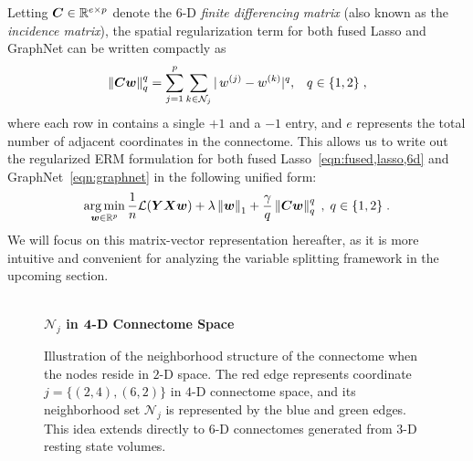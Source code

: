 Letting ${\bm{C}}\in\mathbb{R}^{e\times p}$ denote the $6$-D \emph{finite differencing matrix} (also known as the \emph{incidence matrix}), the spatial regularization term for both fused Lasso and GraphNet can be written compactly as
\begin{equation}
	\left\| {\bm{C}}{\bm{w}} \right\|_q^q=\sum_{j=1}^p\sum_{k\in\mathcal{N}_j} |\,w^{(j)}-w^{(k)}|^q,\;\;\; q\in\{1,2\} \;,
	\nonumber
\end{equation}
where each row in \C contains a single $+1$ and a $-1$ entry, and $e$ represents the total number of adjacent coordinates in the connectome.
This allows us to write out the regularized ERM formulation for both fused Lasso~\eqref{eqn:fused,lasso,6d} and GraphNet~\eqref{eqn:graphnet} in the following unified form: 
\begin{equation}
	\operatorname*{arg\,min}_{{\bm{w}}\in\mathbb{R}^p} \frac{1}{n}\mathcal{L}({\bm{YXw}}) + \lambda\left\| {\bm{w}} \right\|_1 + \frac{\gamma}{q}\left\| {\bm{C}}{\bm{w}} \right\|^q_q  \; ,\; q\in\{1,2\}\;.
	\label{eqn:costfx}
\end{equation}
We will focus on this matrix-vector representation hereafter, as it is more intuitive and convenient for analyzing the variable splitting framework in the upcoming section.

\begin{figure}
	{\begin{center}
	\resizebox{0.39\linewidth}{!}{}\\
	\textbf{{$\mathcal{N}_j$ in $\bm{4}$-D Connectome Space}} \vspace{-15pt}\\
	\end{center}	
	}
	\caption{
	Illustration of the neighborhood structure of the connectome when the nodes reside in $2$-D space.  
	The red edge represents coordinate $j=\big\{(2,4),(6,2)\big\}$ in $4$-D connectome space, and its neighborhood set $\mathcal{N}_j$ is represented by the blue and green edges.  
	This idea extends directly to $6$-D connectomes generated from $3$-D resting state volumes.
	}
	\label{fig,conn,neighbor}
\end{figure}
